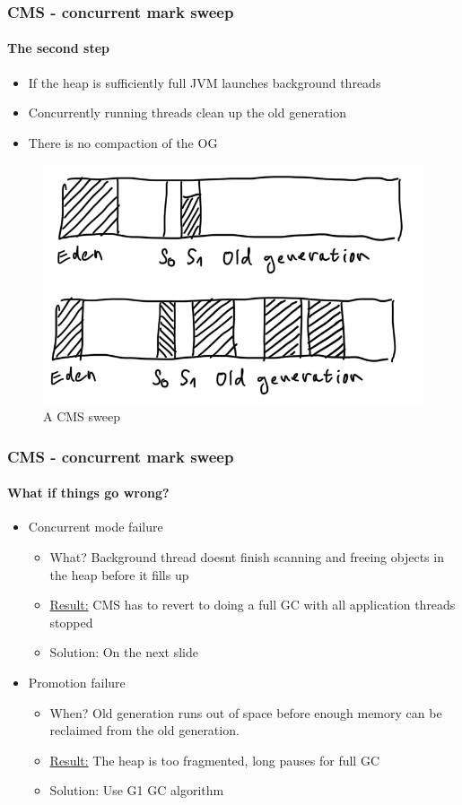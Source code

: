 \documentclass{beamer}
\begin{document}
\begin{frame}
    \frametitle{CMS - concurrent mark sweep}
    \framesubtitle{The second step} 
    \begin{itemize}
        \item If the heap is sufficiently full JVM launches background threads
        \item Concurrently running threads clean up the old generation
        \item There is no compaction of the OG 
    \end{itemize}
    \begin{figure}
        \includegraphics[width = \textwidth]{images/CMS_con.png}
        \caption{A CMS sweep}
    \end{figure}
\end{frame}
\begin{frame}
    \frametitle{CMS - concurrent mark sweep}
    \framesubtitle{What if things go wrong?} 
    \begin{itemize}
        \item Concurrent mode failure
        \begin{itemize}
            \item What? Background thread doesnt finish scanning and freeing objects in the heap before it fills up
            \item \underline{Result:} CMS has to revert to doing a full GC with all application threads stopped
            \item Solution: On the next slide
        \end{itemize}
        \item Promotion failure
        \begin{itemize}
            \item When? Old generation runs out of space before enough memory can be reclaimed from the old generation.
            \item  \underline{Result:} The heap is too fragmented, long pauses for full GC 
            \item Solution: Use G1 GC algorithm
        \end{itemize}
    \end{itemize}
\end{frame}
\end{document}
